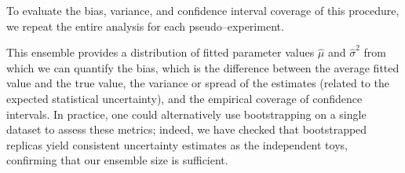             To evaluate the bias, variance, and confidence interval coverage of this procedure, we repeat the entire analysis for each pseudo--experiment.
            
            This ensemble provides a distribution of fitted parameter values $\hat{\mu}$ and $\hat{\sigma}^2$ from which we can quantify the bias, which is the difference between the average fitted value and the true value, the variance or spread of the estimates (related to the expected statistical uncertainty), and the empirical coverage of confidence intervals.
            In practice, one could alternatively use bootstrapping on a single dataset to assess these metrics; indeed, we have checked that bootstrapped replicas yield consistent uncertainty estimates as the independent toys, confirming that our ensemble size is sufficient.

